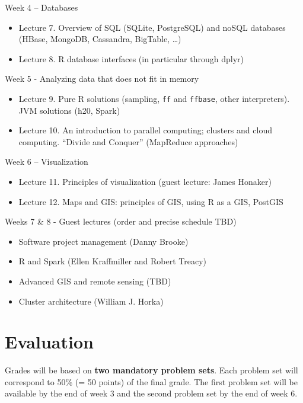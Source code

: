 \documentclass[]{book}
\providecommand{\tightlist}{%
  \setlength{\itemsep}{0pt}\setlength{\parskip}{0pt}}
\theoremstyle{definition}
\theoremstyle{definition}
\theoremstyle{definition}
\theoremstyle{remark}
\begin{document}
Week 4 -- Databases

\begin{itemize}
\tightlist
\item
  Lecture 7. Overview of SQL (SQLite, PostgreSQL) and noSQL databases
  (HBase, MongoDB, Cassandra, BigTable, \ldots{})
\item
  Lecture 8. R database interfaces (in particular through dplyr)
\end{itemize}

Week 5 - Analyzing data that does not fit in memory

\begin{itemize}
\tightlist
\item
  Lecture 9. Pure R solutions (sampling, \texttt{ff} and
  \texttt{ffbase}, other interpreters). JVM solutions (h20, Spark)
\item
  Lecture 10. An introduction to parallel computing; clusters and cloud
  computing. ``Divide and Conquer'' (MapReduce approaches)
\end{itemize}

Week 6 -- Visualization

\begin{itemize}
\tightlist
\item
  Lecture 11. Principles of visualization (guest lecture: James Honaker)
\item
  Lecture 12. Maps and GIS: principles of GIS, using R as a GIS, PostGIS
\end{itemize}

Weeks 7 \& 8 - Guest lectures (order and precise schedule TBD)

\begin{itemize}
\tightlist
\item
  Software project management (Danny Brooke)
\item
  R and Spark (Ellen Kraffmiller and Robert Treacy)
\item
  Advanced GIS and remote sensing (TBD)
\item
  Cluster architecture (William J. Horka)
\end{itemize}

\section{Evaluation}\label{evaluation}

Grades will be based on \textbf{two mandatory problem sets}. Each
problem set will correspond to 50\% (= 50 points) of the final grade.
The first problem set will be available by the end of week 3 and the
second problem set by the end of week 6.
\end{document}
